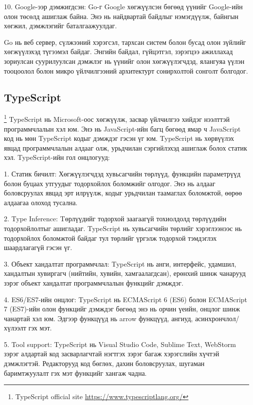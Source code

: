 		10. Google-ээр дэмжигдсэн: Go-г Google хөгжүүлсэн бөгөөд үүнийг Google-ийн олон төсөлд ашиглаж байна. Энэ нь найдвартай байдлыг нэмэгдүүлж, байнгын хөгжил, дэмжлэгийг баталгаажуулдаг.
		
		Go нь веб сервер, сүлжээний хэрэгсэл, тархсан систем болон бусад олон зүйлийг хөгжүүлэхэд түгээмэл байдаг. Энгийн байдал, гүйцэтгэл, зэрэгцээ ажиллахад зориулсан суурилуулсан дэмжлэг нь үүнийг олон хөгжүүлэгчдэд, ялангуяа үүлэн тооцоолол болон микро үйлчилгээний архитектурт сонирхолтой сонголт болгодог.
	\pagebreak
\subsection{TypeScript}
		\footnote{TypeScript official site \url{https://www.typescriptlang.org/}}
			\quad \quad TypeScript нь Microsoft-оос хөгжүүлж, засвар үйлчилгээ хийдэг нээлттэй программчлалын хэл юм. Энэ нь JavaScript-ийн багц бөгөөд ямар ч JavaScript код нь мөн TypeScript кодыг дэмждэг гэсэн үг юм. TypeScript нь хөрвүүлэх явцад программчлалын алдааг олж, урьдчилан сэргийлэхэд ашиглаж болох статик хэл. TypeScript-ийн гол онцлогууд:

			1. Статик бичилт: Хөгжүүлэгчдэд хувьсагчийн төрлүүд, функцийн параметрүүд болон буцаах утгуудыг тодорхойлох боломжийг олгодог. Энэ нь алдааг боловсруулах явцад эрт илрүүлж, кодыг урьдчилан таамаглах боломжтой, өөрөө алдаагаа олоход тусална.
			
			2. Type Inference: Tөрлүүдийг тодорхой заагаагүй тохиолдолд төрлүүдийн тодорхойлолтыг ашигладаг. TypeScript нь хувьсагчийн төрлийг хэрэглээнээс нь тодорхойлох боломжтой байдаг тул төрлийг үргэлж тодорхой тэмдэглэх шаардлагагүй гэсэн үг.
			
			3. Объект хандалтат программчлал: TypeScript нь анги, интерфейс, удамшил, хандалтын хувиргагч (нийтийн, хувийн, хамгаалагдсан), ерөнхий шинж чанарууд зэрэг объект хандалтат программчлалын функцийг дэмждэг.
			
			4. ES6/ES7-ийн онцлог: TypeScript нь ECMAScript 6 (ES6) болон ECMAScript 7 (ES7)-ийн олон функцийг дэмждэг бөгөөд энэ нь орчин үеийн, онцлог шинж чанартай хэл юм. Эдгээр функцүүд нь arrow функцүүд, ангиуд, асинхрончлол/хүлээлт гэх мэт.
			
			5. Tool support: TypeScript нь Visual Studio Code, Sublime Text, WebStorm зэрэг алдартай код засварлагчтай нэгтгэх зэрэг багаж хэрэгслийн хүчтэй дэмжлэгтэй. Редакторууд код бөглөх, дахин боловсруулах, шугаман баримтжуулалт гэх мэт функцийг хангаж чадна.
			

